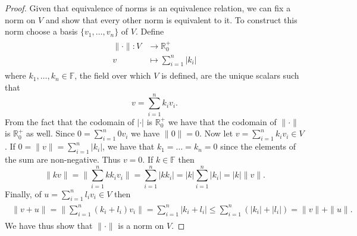 \begin{proof}
	Given that equivalence of norms is an equivalence relation, we can fix a norm on $V$ and show that every other norm is equivalent to it. To construct this norm choose a basis $\{v_1,\dots,v_n\}$ of $V$. Define
	\begin{align}
	\begin{split}
		\|\cdot\|:V&\rightarrow\mathbb{R}^+_0\\
		v&\mapsto\sum_{i=1}^n|k_i|
	\end{split}
	\end{align}
where $k_1,\dots,k_n\in\mathbb{F}$, the field over which $V$ is defined, are the unique scalars such that
	\begin{equation}
		v=\sum_{i=1}^n k_iv_i.
	\end{equation}	 
From the fact that the codomain of $|\cdot|$ is $\mathbb{R}^+_0$ we have that the codomain of $\|\cdot\|$ is $\mathbb{R}^+_0$ as well. Since $0=\sum_{i=1}^n0v_i$ we have $\|0\|=0$. Now let $v=\sum_{i=1}^nk_iv_i\in V$. If $0=\|v\|=\sum_{i=1}^n |k_i|$, we have that $k_1=\dots=k_n=0$ since the elements of the sum are non-negative. Thus $v =0$. If $k\in\mathbb{F}$ then
	\begin{equation}
		\|kv\|=\|\sum_{i=1}^nkk_iv_i\|=\sum_{i=1}^n|kk_i|=|k|\sum_{i=1}^n|k_i|=|k|\|v\|.
	\end{equation}
Finally, of $u=\sum_{i=1}^n l_iv_i\in V$ then
	\begin{align}
	\begin{split}
		\|v+u\|=\|\sum_{i=1}^n(k_i+l_i)v_i\|=\sum_{i=1}^n|k_i+l_i|\leq\sum_{i=1}^n(|k_i|+|l_i|)=\|v\|+\|u\|.
	\end{split}
	\end{align}
We have thus show that $\|\cdot\|$ is a norm on $V$.


\end{proof}
